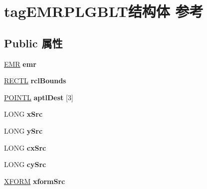 \hypertarget{structtag_e_m_r_p_l_g_b_l_t}{}\section{tag\+E\+M\+R\+P\+L\+G\+B\+L\+T结构体 参考}
\label{structtag_e_m_r_p_l_g_b_l_t}
\subsection*{Public 属性}
\begin{DoxyCompactItemize}
\item 
\mbox{\label{structtag_e_m_r_p_l_g_b_l_t_a82b4f1ca026348f6cf300f086d11daea}} 
\hyperlink{structtag_e_m_r}{E\+MR} {\bfseries emr}
\item 
\mbox{\label{structtag_e_m_r_p_l_g_b_l_t_a4e0538f339c60a71553e67fecaa67bd2}} 
\hyperlink{struct___r_e_c_t_l}{R\+E\+C\+TL} {\bfseries rcl\+Bounds}
\item 
\mbox{\label{structtag_e_m_r_p_l_g_b_l_t_acad094d2266064e90b86708b34424377}} 
\hyperlink{struct___p_o_i_n_t_l}{P\+O\+I\+N\+TL} {\bfseries aptl\+Dest} \mbox{[}3\mbox{]}
\item 
\mbox{\label{structtag_e_m_r_p_l_g_b_l_t_aa0d0621c940d0b3575e7a8c02d429d73}} 
L\+O\+NG {\bfseries x\+Src}
\item 
\mbox{\label{structtag_e_m_r_p_l_g_b_l_t_af2f462201afd11c1b7c58b148e0945a7}} 
L\+O\+NG {\bfseries y\+Src}
\item 
\mbox{\label{structtag_e_m_r_p_l_g_b_l_t_ab215ce5c557e34c2e033dba7b1510934}} 
L\+O\+NG {\bfseries cx\+Src}
\item 
\mbox{\label{structtag_e_m_r_p_l_g_b_l_t_a495ddafab0de9820beca856783d7867f}} 
L\+O\+NG {\bfseries cy\+Src}
\item 
\mbox{\label{structtag_e_m_r_p_l_g_b_l_t_a9659868f274ff6293da0ee2211442a5b}} 
\hyperlink{struct___x_f_o_r_m}{X\+F\+O\+RM} {\bfseries xform\+Src}

\end{DoxyCompactItemize}
